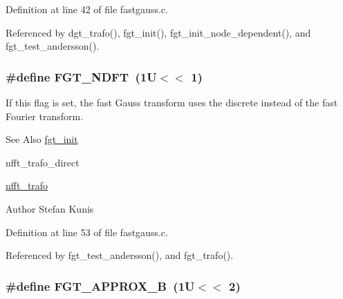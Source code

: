 Definition at line 42 of file fastgauss.\-c.



Referenced by dgt\-\_\-trafo(), fgt\-\_\-init(), fgt\-\_\-init\-\_\-node\-\_\-dependent(), and fgt\-\_\-test\-\_\-andersson().

\hypertarget{group__applications__fastgauss_ga38ab7e1022ff3c5b556ce93078a05d1e}{
\subsubsection[{F\-G\-T\-\_\-\-N\-D\-F\-T}]{\setlength{\rightskip}{0pt plus 5cm}\#define F\-G\-T\-\_\-\-N\-D\-F\-T~(1\-U$<$$<$ 1)}}\label{group__applications__fastgauss_ga38ab7e1022ff3c5b556ce93078a05d1e}


If this flag is set, the fast Gauss transform uses the discrete instead of the fast Fourier transform. 

\begin{DoxySeeAlso}{See Also}
\hyperlink{group__applications__fastgauss_gafe5ae1b90fe2f98495f5c7df70fdcdc8}{fgt\-\_\-init} 

nfft\-\_\-trafo\-\_\-direct 

\hyperlink{group__nfft_ga9f1e6bd9f7f956a8679e6b413c97b421}{nfft\-\_\-trafo} 
\end{DoxySeeAlso}
\begin{DoxyAuthor}{Author}
Stefan Kunis 
\end{DoxyAuthor}


Definition at line 53 of file fastgauss.\-c.



Referenced by fgt\-\_\-test\-\_\-andersson(), and fgt\-\_\-trafo().

\hypertarget{group__applications__fastgauss_ga39c3e544a78853e0da2b9a8c66d3054d}{
\subsubsection[{F\-G\-T\-\_\-\-A\-P\-P\-R\-O\-X\-\_\-\-B}]{\setlength{\rightskip}{0pt plus 5cm}\#define F\-G\-T\-\_\-\-A\-P\-P\-R\-O\-X\-\_\-\-B~(1\-U$<$$<$ 2)}}\label{group__applications__fastgauss_ga39c3e544a78853e0da2b9a8c66d3054d}


